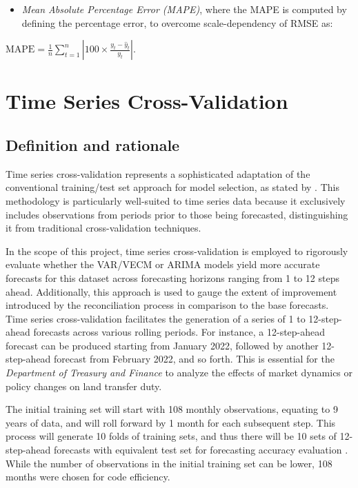 \documentclass[
  11pt,
  a4paper,
]{article}
\providecommand{\tightlist}{%
  \setlength{\itemsep}{0pt}\setlength{\parskip}{0pt}}\usepackage{longtable,booktabs,array}
\begin{document}
\begin{itemize}
\tightlist
\item
  \emph{Mean Absolute Percentage Error (MAPE)}, where the MAPE is
  computed by defining the percentage error, to overcome
  scale-dependency of RMSE as:
\end{itemize}

\(\text{MAPE} = \frac{1}{n} \sum_{t=1}^{n} \left| 100 \times \frac{y_t - \hat{y}_t}{y_t} \right|\).

\section{Time Series
Cross-Validation}\label{time-series-cross-validation}

\subsection{Definition and rationale}\label{definition-and-rationale}

Time series cross-validation represents a sophisticated adaptation of
the conventional training/test set approach for model selection, as
stated by \textcite{hyndman2021forecasting}. This methodology is
particularly well-suited to time series data because it exclusively
includes observations from periods prior to those being forecasted,
distinguishing it from traditional cross-validation techniques.

In the scope of this project, time series cross-validation is employed
to rigorously evaluate whether the VAR/VECM or ARIMA models yield more
accurate forecasts for this dataset across forecasting horizons ranging
from 1 to 12 steps ahead. Additionally, this approach is used to gauge
the extent of improvement introduced by the reconciliation process in
comparison to the base forecasts. Time series cross-validation
facilitates the generation of a series of 1 to 12-step-ahead forecasts
across various rolling periods. For instance, a 12-step-ahead forecast
can be produced starting from January 2022, followed by another
12-step-ahead forecast from February 2022, and so forth. This is
essential for the \emph{Department of Treasury and Finance} to analyze
the effects of market dynamics or policy changes on land transfer duty.

The initial training set will start with 108 monthly observations,
equating to 9 years of data, and will roll forward by 1 month for each
subsequent step. This process will generate 10 folds of training sets,
and thus there will be 10 sets of 12-step-ahead forecasts with
equivalent test set for forecasting accuracy evaluation . While the
number of observations in the initial training set can be lower, 108
months were chosen for code efficiency.
\end{document}
